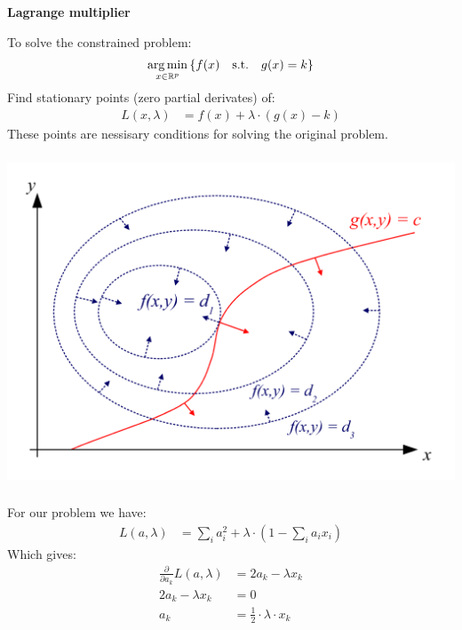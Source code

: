 \begin{frame}[fragile] \frametitle{}

{\bf Lagrange multiplier}

To solve the constrained problem:
\begin{align*}
\mathop{\mathrm{arg\,min}}_{x \in \mathbb{R}^p} \left\{ f(x) \quad \text{s.t.} \quad g(x) = k \right\}
\end{align*}
Find stationary points (zero partial derivates) of:
\begin{align*}
L(x,\lambda) &= f(x) + \lambda \cdot (g(x) - k)
\end{align*}
These points are nessisary conditions for solving the original problem.

\end{frame}

\begin{frame}[fragile] \frametitle{}

\begin{center}
\includegraphics[width=0.95\linewidth]{img/LagrangeMultipliers2D.svg.png}
\end{center}

\end{frame}

\begin{frame}[fragile] \frametitle{}

For our problem we have:
\begin{align*}
L(a,\lambda) &= \sum_i a_i^2 + \lambda \cdot \left( 1 - \sum_i a_i x_i\right)
\end{align*}
Which gives:
\begin{align*}
\frac{\partial}{\partial a_k}  L(a,\lambda) &= 2 a_k - \lambda x_k \\
2 a_k - \lambda x_k &= 0 \\
a_k &= \frac{1}{2} \cdot \lambda \cdot x_k
\end{align*}

\end{frame}

